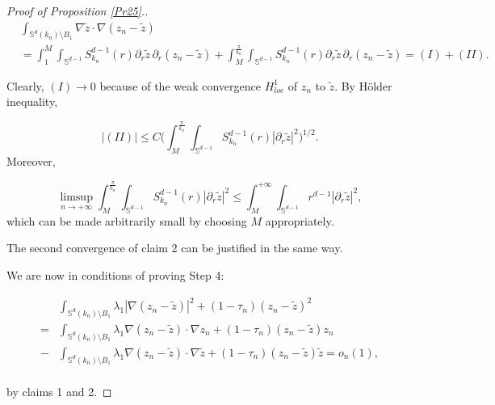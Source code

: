 \documentclass[reqno]{amsart}
\numberwithin{equation}{section}
\newenvironment{key words}{\textbf{Keywords}\mbox{  }}{ }
\begin{document}
\begin{proof}[Proof of Proposition \ref{Pr25}.]
\begin{align*}  & \int_{\mathbb{S}^{d}(k_{n})\setminus B_{1}} \nabla \tilde{z} \cdot \nabla (z_{n}-\tilde{z})\\ &= \int_{1}^{M} \int_{\mathbb{S}^{d-1}} S^{d-1}_{k_n}(r)  \partial_r \tilde{z} \, \partial_r (z_n - \tilde{z}) + \int_{M}^{\frac{\pi}{k_n}} \int_{\mathbb{S}^{d-1}} S^{d-1}_{k_n}(r)  \partial_r \tilde{z} \, \partial_r (z_n - \tilde{z}) = (I) + (II). \end{align*}

Clearly, $(I) \to 0$ because of the weak convergence $H^1_{loc}$ of $z_n$ to $\tilde{z}$. By H\"{o}lder inequality,

$$ |(II)| \leq C  \Big( \int_{M}^{\frac{\pi}{k_n}} \int_{\mathbb{S}^{d-1}} S^{d-1}_{k_n}(r) |\partial_r \tilde{z}|^2  \Big)^{1/2}.$$
Moreover,

$$ \limsup_{n \to + \infty} \int_{M}^{\frac{\pi}{k_n}} \int_{\mathbb{S}^{d-1}} S^{d-1}_{k_n}(r) |\partial_r \tilde{z}|^2  \leq \int_{M}^{+\infty} \int_{\mathbb{S}^{d-1}} r^{d-1} |\partial_r \tilde{z}|^2,$$
which can be made arbitrarily small by choosing $M$ appropriately.

The second convergence of claim 2 can be justified in the same way.


\bigskip We are now in conditions of proving Step 4:


\begin{align*} & \int_{\mathbb{S}^{d}(k_{n})\setminus B_{1}} \lambda_{1} |\nabla (z_{n} -\tilde{z})| ^2 + (1-\tau_{n}) (z_{n}- \tilde{z})^2 \\= &  \int_{\mathbb{S}^{d}(k_{n})\setminus B_{1}} \lambda_{1} \nabla (z_{n} -\tilde{z}) \cdot \nabla z_n + (1-\tau_{n}) (z_{n}- \tilde{z}) z_n  \\ - &  \int_{\mathbb{S}^{d}(k_{n})\setminus B_{1}} \lambda_{1} \nabla (z_{n} -\tilde{z}) \cdot \nabla \tilde{z} + (1-\tau_{n}) (z_{n}- \tilde{z}) \tilde{z}= o_n(1), \\ \end{align*}

by claims 1 and 2.

%
%
%




\end{proof}
\end{document}
